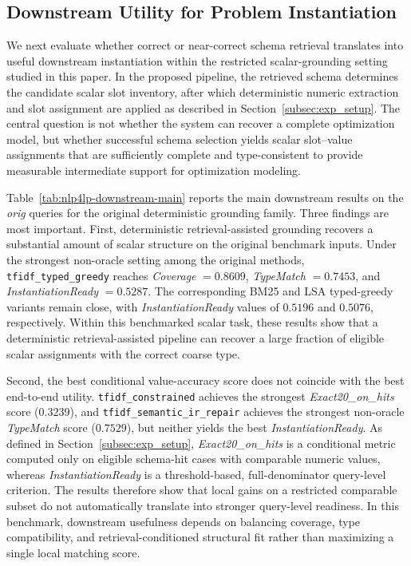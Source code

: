\documentclass[pdflatex,sn-basic,Numbered]{sn-jnl}
\begin{document}
\subsection{Downstream Utility for Problem Instantiation}
\label{subsec:exp_downstream}

We next evaluate whether correct or near-correct schema retrieval translates into useful downstream instantiation within the restricted scalar-grounding setting studied in this paper. In the proposed pipeline, the retrieved schema determines the candidate scalar slot inventory, after which deterministic numeric extraction and slot assignment are applied as described in Section~\ref{subsec:exp_setup}. The central question is not whether the system can recover a complete optimization model, but whether successful schema selection yields scalar slot--value assignments that are sufficiently complete and type-consistent to provide measurable intermediate support for optimization modeling.

Table~\ref{tab:nlp4lp-downstream-main} reports the main downstream results on the \emph{orig} queries for the original deterministic grounding family. Three findings are most important. First, deterministic retrieval-assisted grounding recovers a substantial amount of scalar structure on the original benchmark inputs. Under the strongest non-oracle setting among the original methods, \texttt{tfidf\_typed\_greedy} reaches \textit{Coverage} $=0.8609$, \textit{TypeMatch} $=0.7453$, and \textit{InstantiationReady} $=0.5287$. The corresponding BM25 and LSA typed-greedy variants remain close, with \textit{InstantiationReady} values of $0.5196$ and $0.5076$, respectively. Within this benchmarked scalar task, these results show that a deterministic retrieval-assisted pipeline can recover a large fraction of eligible scalar assignments with the correct coarse type.

Second, the best conditional value-accuracy score does not coincide with the best end-to-end utility. \texttt{tfidf\_constrained} achieves the strongest \textit{Exact20\_on\_hits} score ($0.3239$), and \texttt{tfidf\_semantic\_ir\_repair} achieves the strongest non-oracle \textit{TypeMatch} score ($0.7529$), but neither yields the best \textit{InstantiationReady}. As defined in Section~\ref{subsec:exp_setup}, \textit{Exact20\_on\_hits} is a conditional metric computed only on eligible schema-hit cases with comparable numeric values, whereas \textit{InstantiationReady} is a threshold-based, full-denominator query-level criterion. The results therefore show that local gains on a restricted comparable subset do not automatically translate into stronger query-level readiness. In this benchmark, downstream usefulness depends on balancing coverage, type compatibility, and retrieval-conditioned structural fit rather than maximizing a single local matching score.
\end{document}
